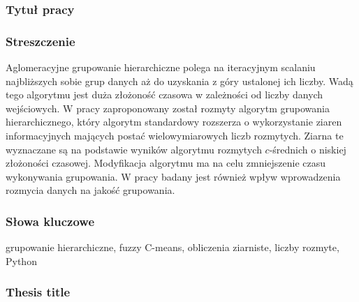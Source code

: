 \documentclass[a4paper,twoside,12pt]{book}
\begin{document}


\cleardoublepage

\rmfamily\normalfont
\pagestyle{empty}



\subsubsection*{Tytuł pracy} 
\Title

\subsubsection*{Streszczenie}
Aglomeracyjne grupowanie hierarchiczne polega na iteracyjnym scalaniu najbliższych sobie grup danych aż do uzyskania z góry ustalonej ich liczby. Wadą tego algorytmu jest duża złożoność czasowa w zależności od liczby danych wejściowych. W pracy zaproponowany został rozmyty algorytm grupowania hierarchicznego, który algorytm standardowy rozszerza o wykorzystanie ziaren informacyjnych mających postać wielowymiarowych liczb rozmytych. Ziarna te wyznaczane są na podstawie wyników algorytmu rozmytych $c$-średnich o niskiej złożoności czasowej. Modyfikacja algorytmu ma na celu zmniejszenie czasu wykonywania grupowania. W pracy badany jest również wpływ wprowadzenia rozmycia danych na jakość grupowania.

\subsubsection*{Słowa kluczowe} 
grupowanie hierarchiczne, fuzzy C-means, obliczenia ziarniste, liczby rozmyte, Python

\subsubsection*{Thesis title} 
\begin{otherlanguage}{british}
\TitleAlt
\end{otherlanguage}
\end{document}

